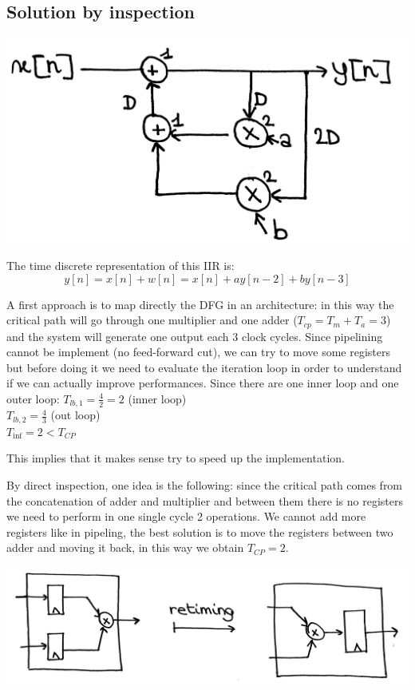 \subsection{Solution by inspection}
\begin{center}
  \includegraphics[width=0.6\linewidth]{img/img1/11}
\end{center}

The time discrete representation of this IIR is:
$$y[n]=x[n]+w[n]=x[n]+ay[n-2]+by[n-3]$$

A first approach is to map directly the DFG in an architecture: in this way the critical path will go through one multiplier and one adder ($T_{cp}=T_m+T_a=3$) and the system will generate one output each 3 clock cycles. Since pipelining cannot be implement (no feed-forward cut), we can try to move some registers but before doing it we need to evaluate the iteration loop in order to understand if we can actually improve performances. Since there are one inner loop and one outer loop:
$T_{lb,1}=\frac{4}{2}=2$ (inner loop) \\
$T_{lb,2}=\frac{4}{3}$ (out loop)\\
$T_{\inf}=2 < T_{CP}$

This implies that it makes sense try to speed up the implementation.

By direct inspection, one idea is the following: since the critical path comes from the concatenation of adder and multiplier and between them there is no registers we need to perform in one single cycle 2 operations. We cannot add more registers like in pipeling, the best solution is to move the registers between two adder and moving it back, in this way we obtain $T_{CP}=2$.

\begin{center}
  \includegraphics[width=0.7\linewidth]{img/img1/12}
\end{center}

